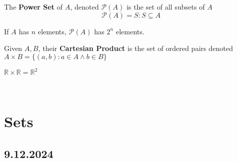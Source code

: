 \documentclass[11pt]{scrartcl}
\begin{document}
\begin{definition}
    The \textbf{Power Set} of $A$, denoted $\mathcal{P}(A)$ is the set of all subsets of $A$ $$\mathcal{P}(A) = {S:S\subseteq A}$$
\end{definition}
\begin{remark}
    If $A$ has $n$ elements, $\mathcal{P}(A)$ has $2^n$ elements.  
\end{remark}
\begin{definition}
    Given $A, B$, their \textbf{Cartesian Product} is the set of ordered pairs denoted $A \times B = \{(a, b): a \in A \land b \in B\}$
\end{definition}
\begin{example}
    $\mathbb{R}\times \mathbb{R} = \mathbb{R}^2$
\end{example}
\noindent
\Line
\\
\section{Sets}
\subsection{9.12.2024}
\end{document}
